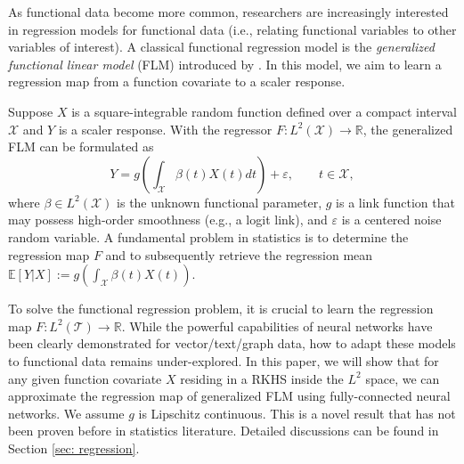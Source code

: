 \documentclass{article}
\def\RR{\mathbb R}
\numberwithin{equation}{section}
\begin{document}
As functional data become more common, researchers are increasingly interested
in regression
models for functional data (i.e., relating functional variables to other variables of interest). A classical functional regression model is the \textit{generalized functional linear model} (FLM) introduced by \citep{muller2005generalized}.  
In this model, we aim to learn a regression map from a function covariate to a scaler response.
 
 Suppose $X$ is a square-integrable random function defined over a compact interval $\mathcal{X}$ and $Y$ is a scaler response. 
With the regressor $F:L^2(\mathcal{X})\rightarrow \RR$, the generalized FLM can be formulated as
\begin{equation}
     Y =  g\left(\int_\mathcal{X} \beta(t) X(t) dt\right) + \varepsilon, \qquad t\in \mathcal{X},
\end{equation}
where $\beta \in L^2(\mathcal{X})$ is the unknown functional parameter,
$g$ is a link function that may possess high-order smoothness (e.g., a logit link), and $\varepsilon$ is a centered noise random variable. 
A fundamental problem in statistics is to determine the regression map $F$ and to subsequently retrieve the regression mean $\mathbb{E}[Y|X]:= g\left(\int_\mathcal{X} \beta(t) X(t) \right)$. 

To solve the functional regression problem, it is crucial to learn the regression map $F:L^2(\mathcal{T})\rightarrow \RR$. While the powerful capabilities of neural networks have been clearly demonstrated for vector/text/graph data, how to adapt these models to functional data remains under-explored. 
In this paper, we will show that for any given function covariate $X$ residing in a RKHS inside the $L^2$ space, we can approximate the regression map of generalized FLM using fully-connected neural networks. 
We assume $g$ is Lipschitz continuous. This is a novel result that has not been proven before in statistics literature. Detailed discussions can be found in Section \ref{sec: regression}. 
\end{document}
